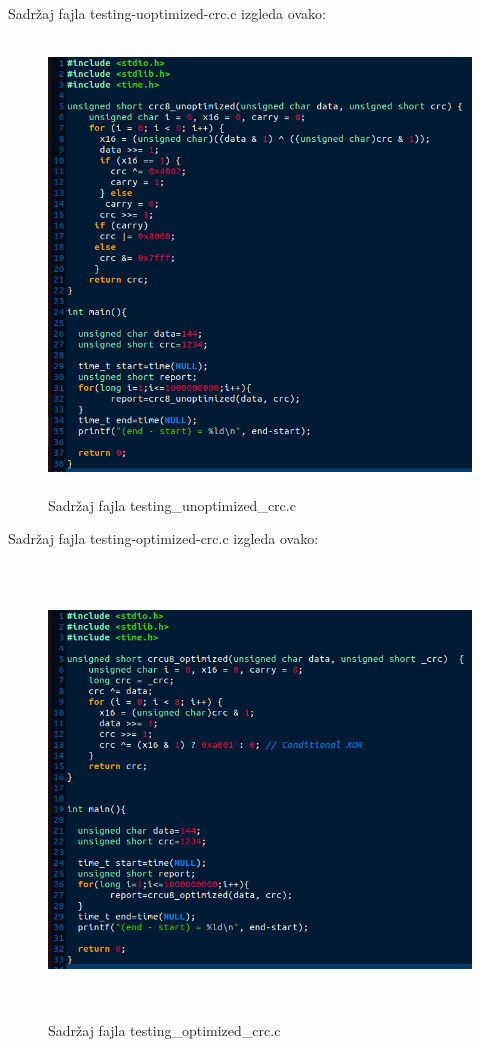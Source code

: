 \documentclass[12pt,oneside]{memoir}
\begin{document}
Sadržaj fajla testing-uoptimized-crc.c izgleda ovako:
\begin{figure}
\includegraphics[width=\textwidth, height=12cm]{testing_unoptimized_crc}
\caption{Sadržaj fajla testing\_unoptimized\_crc.c}
\end{figure}

Sadržaj fajla testing-optimized-crc.c izgleda ovako:
\begin{figure}
\includegraphics[width=\textwidth, height=12cm]{testing_optimized_crc}
\caption{Sadržaj fajla testing\_optimized\_crc.c}
\end{figure}
\end{document}
